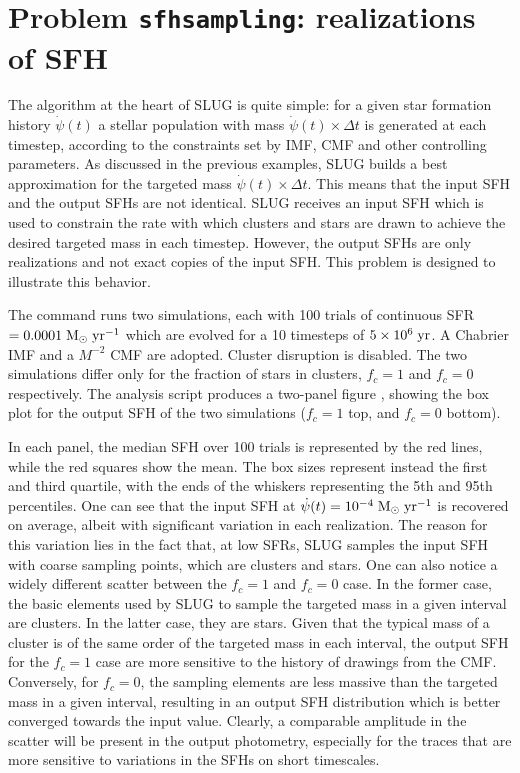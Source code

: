 \documentclass[letterpaper,10pt,english]{sphinxmanual}
\begin{document}
\section{Problem \texttt{sfhsampling}: realizations of SFH}
\label{tests:problem-sfhsampling-realizations-of-sfh}
The algorithm at the heart of SLUG is quite simple: for a given star formation history
\(\dot\psi(t)\) a stellar population with mass \(\dot\psi(t)\times \Delta t\)
is generated at each timestep, according to the constraints set by IMF, CMF and other
controlling parameters. As discussed in the previous examples, SLUG builds a best
approximation for the targeted mass \(\dot\psi(t)\times \Delta t\). This means that
the input SFH and the output SFHs are not identical. SLUG receives an input SFH which
is used to constrain the rate with which clusters and stars are drawn to achieve the
desired targeted mass in each timestep. However, the output SFHs are only realizations
and not exact copies  of the input SFH. This problem is designed to illustrate this behavior.

The command   runs two  simulations, each with 100 trials
of continuous  SFR \(=0.0001\rm\;M_\odot\;yr^{-1}\) which are evolved for a
10 timesteps of  \(5\times 10^6\rm\;yr\). A Chabrier IMF and a \(M^{-2}\)
CMF are adopted. Cluster disruption is disabled. The two simulations
differ only for the fraction of stars in clusters, \(f_c = 1\) and \(f_c = 0\) respectively.
The analysis script  produces a two-panel figure
, showing the box plot for the output SFH of the two simulations
(\(f_c = 1\) top, and \(f_c = 0\) bottom).

In each panel, the median SFH over 100 trials is represented by the red lines, while the red squares
show the mean. The box sizes represent instead the first and third quartile, with the
ends of the whiskers representing the 5th and 95th percentiles. One can see that the input
SFH at \(\dot\psi(t)=10^{-4}\rm\;M_\odot\;yr^{-1}\) is recovered on average, albeit with
significant variation in each realization. The reason for this variation lies in the fact that,
at low SFRs, SLUG samples the input SFH with coarse sampling points, which are clusters and stars.
One can also notice a widely different scatter between the \(f_c = 1\) and \(f_c = 0\)
case. In the former case, the basic elements used by SLUG to sample the targeted mass in  a
given interval are clusters. In the latter case, they are stars. Given that the typical mass of a
cluster is of the same order of the targeted mass in each interval, the output SFH for
the \(f_c = 1\) case are more sensitive to the history of drawings from the CMF.
Conversely, for  \(f_c = 0\), the sampling elements are less massive than the
targeted mass in a given interval, resulting in an output SFH distribution which is
better converged towards the input value. Clearly, a comparable amplitude in the scatter
will be present in the output photometry, especially for the traces that are more sensitive
to variations in the SFHs on short timescales.
\end{document}
